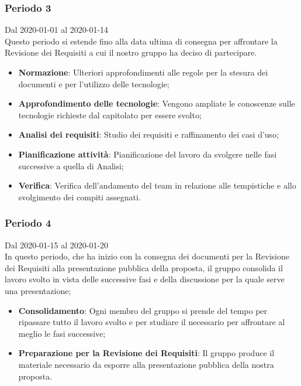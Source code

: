 \subsubsection{Periodo 3}
Dal 2020-01-01 al 2020-01-14\\
Questo periodo si estende fino alla data ultima di consegna per affrontare la Revisione dei Requisiti a cui il nostro gruppo ha deciso di partecipare.\\
\begin{itemize}
	\item \textbf{Normazione}: Ulteriori approfondimenti alle regole per la stesura dei documenti e per l'utilizzo delle tecnologie;
	\item \textbf{Approfondimento delle tecnologie}: Vengono ampliate le conoscenze sulle tecnologie richieste dal capitolato per essere svolto;
	\item \textbf{Analisi dei requisiti}: Studio dei requisiti e raffinamento dei casi d'uso;
	\item \textbf{Pianificazione attività}: Pianificazione del lavoro da svolgere nelle fasi successive a quella di Analisi;
	\item \textbf{Verifica}: Verifica dell'andamento del team in relazione alle tempistiche e allo svolgimento dei compiti assegnati.
\end{itemize}

\subsubsection{Periodo 4} 
Dal 2020-01-15 al 2020-01-20\\
In questo periodo, che ha inizio con la consegna dei documenti per la Revisione dei Requisiti alla presentazione pubblica della proposta, il gruppo consolida il lavoro svolto in vista delle successive fasi e della discussione per la quale serve una presentazione;
\begin{itemize}
	\item \textbf{Consolidamento}: Ogni membro del gruppo si prende del tempo per ripassare tutto il lavoro svolto e per studiare il necessario per affrontare al meglio le fasi successive;
	\item \textbf{Preparazione per la Revisione dei Requisiti}: Il gruppo produce il materiale necessario da esporre alla presentazione pubblica della nostra proposta.
\end{itemize}

